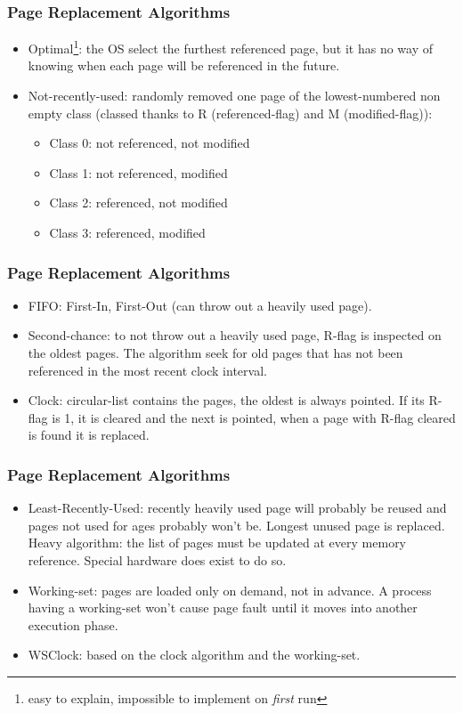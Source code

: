   \begin{frame}
    \frametitle{Page Replacement Algorithms}
    \begin{itemize}
      \item Optimal\footnote{easy to explain, impossible to implement on \emph{first} run}: the OS select the furthest referenced page, but it has no way of knowing when each page will be referenced in the future.
      \item Not-recently-used: randomly removed one page of the lowest-numbered non empty class (classed thanks to R (referenced-flag) and M (modified-flag)):
      \begin{itemize}
        \item Class 0: not referenced, not modified
        \item Class 1: not referenced, modified
        \item Class 2: referenced, not modified
        \item Class 3: referenced, modified
      \end{itemize}
    \end{itemize}
  \end{frame}

  \begin{frame}
    \frametitle{Page Replacement Algorithms}
    \begin{itemize}
      \item FIFO: First-In, First-Out (can throw out a heavily used page).
      \item Second-chance: to not throw out a heavily used page, R-flag is inspected on the oldest pages. The algorithm seek for old pages that has not been referenced in the most recent clock interval.
      \item Clock: circular-list contains the pages, the oldest is always pointed. If its R-flag is 1, it is cleared and the next is pointed, when a page with R-flag cleared is found it is replaced.
    \end{itemize}
  \end{frame}

  \begin{frame}
    \frametitle{Page Replacement Algorithms}
    \begin{itemize}
      \item Least-Recently-Used: recently heavily used page will probably be reused and pages not used for ages probably won't be. Longest unused page is replaced. Heavy algorithm: the list of pages must be updated at every memory reference. Special hardware does exist to do so.
      \item Working-set: pages are loaded only on demand, not in advance. A process having a working-set won't cause page fault until it moves into another execution phase.
      \item WSClock: based on the clock algorithm and the working-set.
    \end{itemize}
  \end{frame}

